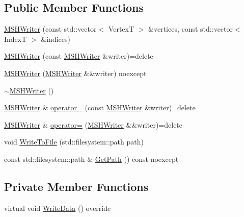 \subsection*{Public Member Functions}
\begin{DoxyCompactItemize}
\item 
\mbox{\hyperlink{classmage_1_1rendering_1_1loader_1_1_m_s_h_writer_a5e1a7ed8ca94f157f52bba929cac2fd3}{M\+S\+H\+Writer}} (const std\+::vector$<$ VertexT $>$ \&vertices, const std\+::vector$<$ IndexT $>$ \&indices)
\item 
\mbox{\hyperlink{classmage_1_1rendering_1_1loader_1_1_m_s_h_writer_ade94bfa4dc8b4bdc2249cd882f2240e4}{M\+S\+H\+Writer}} (const \mbox{\hyperlink{classmage_1_1rendering_1_1loader_1_1_m_s_h_writer}{M\+S\+H\+Writer}} \&writer)=delete
\item 
\mbox{\hyperlink{classmage_1_1rendering_1_1loader_1_1_m_s_h_writer_a877a042ef1a4472c9d1cece846b2a70a}{M\+S\+H\+Writer}} (\mbox{\hyperlink{classmage_1_1rendering_1_1loader_1_1_m_s_h_writer}{M\+S\+H\+Writer}} \&\&writer) noexcept
\item 
\mbox{\hyperlink{classmage_1_1rendering_1_1loader_1_1_m_s_h_writer_ae2ead8892a1818c59d55a7a5ecdf50b3}{$\sim$\+M\+S\+H\+Writer}} ()
\item 
\mbox{\hyperlink{classmage_1_1rendering_1_1loader_1_1_m_s_h_writer}{M\+S\+H\+Writer}} \& \mbox{\hyperlink{classmage_1_1rendering_1_1loader_1_1_m_s_h_writer_a661eaab96539a7bf08f100095603af0e}{operator=}} (const \mbox{\hyperlink{classmage_1_1rendering_1_1loader_1_1_m_s_h_writer}{M\+S\+H\+Writer}} \&writer)=delete
\item 
\mbox{\hyperlink{classmage_1_1rendering_1_1loader_1_1_m_s_h_writer}{M\+S\+H\+Writer}} \& \mbox{\hyperlink{classmage_1_1rendering_1_1loader_1_1_m_s_h_writer_a98bdde59fa1a7a6398453f0c7bc4e8dd}{operator=}} (\mbox{\hyperlink{classmage_1_1rendering_1_1loader_1_1_m_s_h_writer}{M\+S\+H\+Writer}} \&\&writer)=delete
\item 
void \mbox{\hyperlink{classmage_1_1rendering_1_1loader_1_1_m_s_h_writer_a6ce9780687a45a6c6f98e0843190b63b}{Write\+To\+File}} (std\+::filesystem\+::path path)
\item 
const std\+::filesystem\+::path \& \mbox{\hyperlink{classmage_1_1rendering_1_1loader_1_1_m_s_h_writer_a812e65c16bf1b14d396d109eb969eeb8}{Get\+Path}} () const noexcept
\end{DoxyCompactItemize}
\subsection*{Private Member Functions}
\begin{DoxyCompactItemize}
\item 
virtual void \mbox{\hyperlink{classmage_1_1rendering_1_1loader_1_1_m_s_h_writer_ad61ee7097e1bfb52ca9a0697d2cd6a7e}{Write\+Data}} () override
\end{DoxyCompactItemize}
